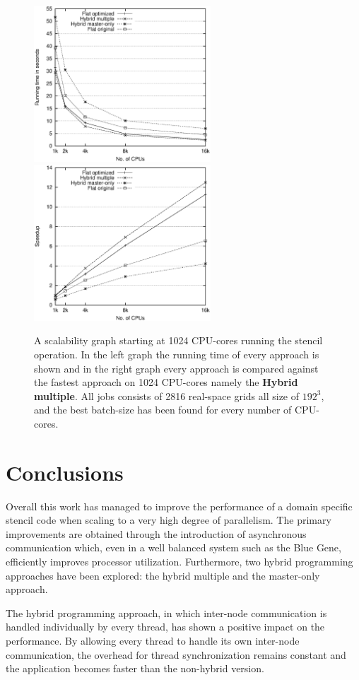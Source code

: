 \documentclass[preprint,3p,times,twocolumn]{elsarticle}
\begin{document}
\begin{figure}
\centerline{
\mbox{\includegraphics[width=250px]{gfx/fidi_scaleruntime}}
\mbox{\includegraphics[width=250px]{gfx/fidi_scale}}
} 
 \caption{A scalability graph starting at 1024 CPU-cores running the stencil operation. In the left graph the running time of every approach is shown and in the right graph every approach is compared against the fastest approach on 1024 CPU-cores namely the \textbf{Hybrid multiple}. All jobs consists of 2816 real-space grids all size of $192^3$, and the best batch-size has been found for every number of CPU-cores.}
 \label{fig:scale}
\end{figure}


\section{Conclusions}
Overall this work has managed to improve the performance of a domain specific stencil code when scaling to a very high degree of parallelism. The primary improvements are obtained through the introduction of asynchronous communication which, even in a well balanced system such as the Blue Gene, efficiently improves processor utilization. Furthermore, two hybrid programming approaches have been explored: the hybrid multiple and the master-only approach. 

The hybrid programming approach, in which inter-node communication is handled individually by every thread, has shown a positive impact on the performance. By allowing every thread to handle its own inter-node communication, the overhead for thread synchronization remains constant and the application becomes faster than the non-hybrid version.
\end{document}
